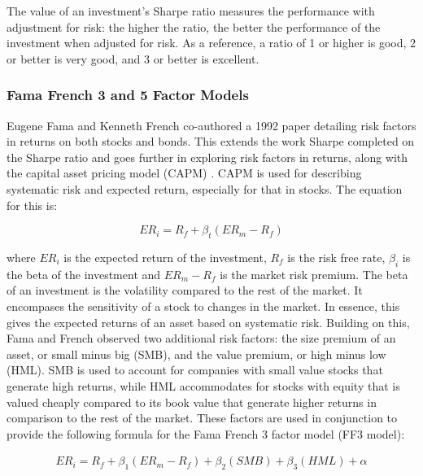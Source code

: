 The value of an investment's Sharpe ratio measures the performance with adjustment for risk: the higher the ratio, the better the performance of the investment when adjusted for risk. As a reference, a ratio of 1 or higher is good, 2 or better is very good, and 3 or better is excellent. 

\subsubsection{Fama French 3 and 5 Factor Models}
Eugene Fama and Kenneth French co-authored a 1992 paper detailing risk factors in returns on both stocks and bonds. This extends the work Sharpe completed on the Sharpe ratio and goes further in exploring risk factors in returns, along with the capital asset pricing model (CAPM) \cite{ff3}. CAPM is used for describing systematic risk and expected return, especially for that in stocks. The equation for this is:

\begin{equation}
ER_i = R_f + \beta_t (ER_m - R_f)
\end{equation}

\noindent
where $ER_i$ is the expected return of the investment, $R_f$ is the risk free rate, $\beta_i$ is the beta of the investment and $ER_m - R_f$ is the market risk premium. The beta of an investment is the volatility compared to the rest of the market. It encompases the sensitivity of a stock to changes in the market. In essence, this gives the expected returns of an asset based on systematic risk. Building on this, Fama and French observed two additional risk factors: the size premium of an asset, or small minus big (SMB), and the value premium, or high minus low (HML). SMB is used to account for companies with small value stocks that generate high returns, while HML accommodates for stocks with equity that is valued cheaply compared to its book value that generate higher returns in comparison to the rest of the market. These factors are used in conjunction to provide the following formula for the Fama French 3 factor model (FF3 model):

\begin{align*}
ER_i = R_f + \beta_1(ER_m -R_f) + \beta_2 (SMB) + \beta_3(HML) + \alpha
\end{align*}

